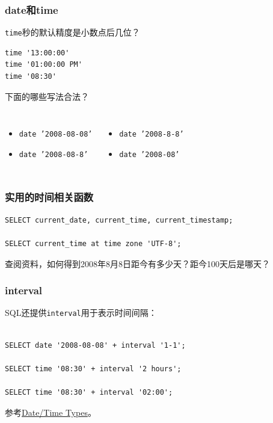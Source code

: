 \documentclass[aspectratio=169, 14pt]{beamer}
\begin{document}
\begin{frame}[fragile]
    \frametitle{date和time}

 \texttt{time}秒的默认精度是小数点后几位？
\begin{verbatim}
time '13:00:00'
time '01:00:00 PM'
time '08:30'
\end{verbatim}

\pause
{} 下面的哪些写法合法？
\begin{columns}
    \begin{itemize}
        \item \texttt{date '2008-08-08'}
        \item \texttt{date '2008-08-8'}
    \end{itemize}
    \begin{itemize}
        \item \texttt{date '2008-8-8'}
        \item \texttt{date '2008-08'}
    \end{itemize}
\end{columns}

\end{frame}

\begin{frame}[fragile]
    \frametitle{实用的时间相关函数}

    \begin{verbatim}
SELECT current_date, current_time, current_timestamp;

SELECT current_time at time zone 'UTF-8';
    \end{verbatim}

 查阅资料，如何得到2008年8月8日距今有多少天？距今100天后是哪天？

\end{frame}

\begin{frame}[fragile]
    \frametitle{interval}
SQL还提供\alert{\texttt{interval}}用于表示时间间隔：

\begin{verbatim}

SELECT date '2008-08-08' + interval '1-1';

SELECT time '08:30' + interval '2 hours';

SELECT time '08:30' + interval '02:00';
    \end{verbatim}

参考\href{https://www.postgresql.org/docs/14/datatype-datetime.html}{Date/Time Types}。

\end{frame}
\end{document}
